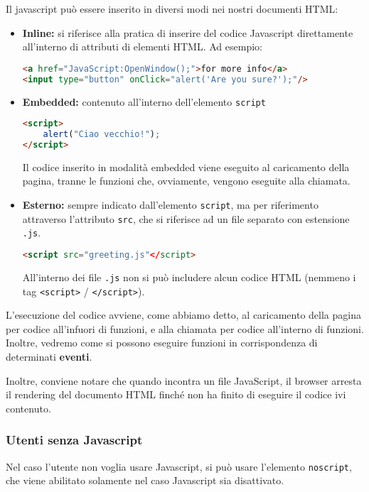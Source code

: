 \documentclass[a4paper,11pt]{article}
\begin{document}
Il javascript può essere inserito in diversi modi nei nostri documenti HTML:
\begin{itemize}
	\item \textbf{Inline:} si riferisce alla pratica di inserire del codice Javascript direttamente all'interno di attributi di elementi HTML. Ad esempio:
\begin{lstlisting}[language=html, style=codestyle]	
<a href="JavaScript:OpenWindow();">for more info</a>
<input type="button" onClick="alert('Are you sure?');"/>
\end{lstlisting}
	\item \textbf{Embedded:} contenuto all'interno dell'elemento \lstinline|script|
\begin{lstlisting}[language=html, style=codestyle]	
<script>
	alert("Ciao vecchio!");
</script>
\end{lstlisting}
Il codice inserito in modalità embedded viene eseguito al caricamento della pagina, tranne le funzioni che, ovviamente, vengono eseguite alla chiamata.
	\item \textbf{Esterno:} sempre indicato dall'elemento \lstinline|script|, ma per riferimento attraverso l'attributo \lstinline|src|, che si riferisce ad un file separato con estensione \lstinline|.js|.
\begin{lstlisting}[language=html, style=codestyle]	
<script src="greeting.js"</script>
\end{lstlisting}
All'interno dei file \lstinline|.js| non si può includere alcun codice HTML (nemmeno i tag \lstinline|<script>| / \lstinline|</script>|).
\end{itemize}

L'esecuzione del codice avviene, come abbiamo detto, al caricamento della pagina per codice all'infuori di funzioni, e alla chiamata per codice all'interno di funzioni.
Inoltre, vedremo come si possono eseguire funzioni in corrispondenza di determinati \textbf{eventi}.

Inoltre, conviene notare che quando incontra un file JavaScript, il browser arresta il rendering del documento HTML finché non ha finito di eseguire il codice ivi contenuto.

\subsubsection{Utenti senza Javascript}
Nel caso l'utente non voglia usare Javascript, si può usare l'elemento \lstinline|noscript|, che viene abilitato solamente nel caso Javascript sia disattivato.
\end{document}
